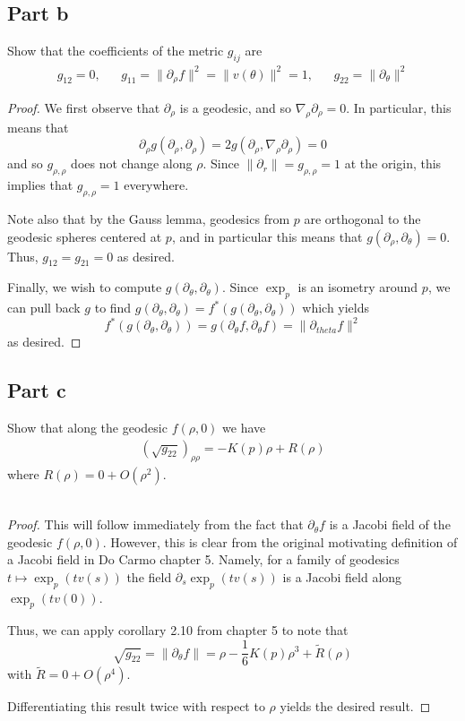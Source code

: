 \documentclass[fontsize=11pt]{scrartcl} %
\numberwithin{equation}{section} %
\numberwithin{figure}{section} %
\numberwithin{table}{section} %
\begin{document}
\subsection*{Part b}
Show that the coefficients of the metric $g_{ij}$ are
\[
    \begin{aligned}
        g_{12}=0,& &g_{11}=\|\partial_{\rho}f\|^2 = \|v(\theta)\|^2=1,&
        &g_{22}=\|\partial_{\theta}\|^2
    \end{aligned}
\]

\begin{proof}
    We first observe that $\partial_{\rho}$ is a geodesic, and so
    $\nabla_{\rho}\partial_{\rho} = 0$. In particular, this means that
    \[
        \partial_{\rho}g(\partial_\rho,\partial_{\rho}) =
        2g(\partial_{\rho},\nabla_{\rho}\partial_{\rho}) = 0
    \]
    and so $g_{\rho,\rho}$ does not change along $\rho$. Since $\|\partial_r\| =
    g_{\rho,\rho} = 1$ at the origin, this implies that $g_{\rho,\rho}=1$
    everywhere.

    Note also that by the Gauss lemma, geodesics from $p$ are orthogonal to the
    geodesic spheres centered at $p$, and in
    particular this means that $g(\partial_{\rho},\partial_{\theta}) = 0$. Thus,
    $g_{12}=g_{21}=0$ as desired.

    Finally, we wish to compute $g(\partial_{\theta},\partial_{\theta})$.
    Since $\exp_p$ is an isometry around $p$, we can pull back $g$ to find
    $g(\partial_{\theta},\partial_{\theta}) =
    f^*(g(\partial_{\theta},\partial_{\theta}))$ which yields
        \[
            f^*(g(\partial_{\theta},\partial_{\theta})) =
            g(\partial_{\theta}f,\partial_{\theta}f) = \|\partial_{theta}f\|^2
        \]
    as desired.
\end{proof}

\subsection*{Part c}
Show that along the geodesic $f(\rho,0)$ we have
\[
\begin{aligned}
    (\sqrt{g_{22}})_{\rho\rho} = -K(p)\rho + R(\rho)
\end{aligned}
\]
where $R(\rho) = 0 + O(\rho^2)$.
\\
\\
\begin{proof}
    This will follow immediately from the fact that $\partial_{\theta}f$ is a
    Jacobi field of the geodesic $f(\rho,0)$. However, this is clear from the
    original motivating definition of a Jacobi field in Do Carmo chapter 5.
    Namely, for a family of geodesics $t\mapsto \exp_p(tv(s))$ the field
    $\partial_s\exp_p(tv(s))$ is a Jacobi field along $\exp_p(tv(0))$.

    Thus, we can apply corollary 2.10 from chapter 5 to note that
    \[
        \sqrt{g_{22}} = \|\partial_{\theta}f\| =
        \rho-\frac{1}{6}K(p)\rho^3 + \tilde{R}(\rho)
    \]
    with $\tilde{R} = 0 +O(\rho^4)$. 

    Differentiating this result twice with respect to $\rho$ yields the desired
    result.
\end{proof}
\end{document}

